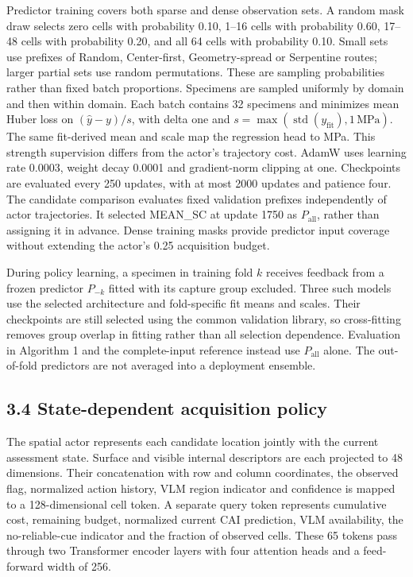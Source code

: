 Predictor training covers both sparse and dense observation sets. A random mask draw selects zero cells with probability 0.10, 1--16 cells with probability 0.60, 17--48 cells with probability 0.20, and all 64 cells with probability 0.10. Small sets use prefixes of Random, Center-first, Geometry-spread or Serpentine routes; larger partial sets use random permutations. These are sampling probabilities rather than fixed batch proportions. Specimens are sampled uniformly by domain and then within domain. Each batch contains 32 specimens and minimizes mean Huber loss on \((\hat{y}-y)/s\), with delta one and \(s=\max(\operatorname{std}(y_{\mathrm{fit}}),1\,\mathrm{MPa})\). The same fit-derived mean and scale map the regression head to MPa. This strength supervision differs from the actor's trajectory cost. AdamW uses learning rate 0.0003, weight decay 0.0001 and gradient-norm clipping at one. Checkpoints are evaluated every 250 updates, with at most 2000 updates and patience four. The candidate comparison evaluates fixed validation prefixes independently of actor trajectories. It selected MEAN\_SC at update 1750 as \(P_{\mathrm{all}}\), rather than assigning it in advance. Dense training masks provide predictor input coverage without extending the actor's 0.25 acquisition budget.

During policy learning, a specimen in training fold \(k\) receives feedback from a frozen predictor \(P_{-k}\) fitted with its capture group excluded. Three such models use the selected architecture and fold-specific fit means and scales. Their checkpoints are still selected using the common validation library, so cross-fitting removes group overlap in fitting rather than all selection dependence. Evaluation in Algorithm 1 and the complete-input reference instead use \(P_{\mathrm{all}}\) alone. The out-of-fold predictors are not averaged into a deployment ensemble.

\hypertarget{state-dependent-acquisition-policy}{%
\subsection{3.4 State-dependent acquisition policy}\label{state-dependent-acquisition-policy}}

The spatial actor represents each candidate location jointly with the current assessment state. Surface and visible internal descriptors are each projected to 48 dimensions. Their concatenation with row and column coordinates, the observed flag, normalized action history, VLM region indicator and confidence is mapped to a 128-dimensional cell token. A separate query token represents cumulative cost, remaining budget, normalized current CAI prediction, VLM availability, the no-reliable-cue indicator and the fraction of observed cells. These 65 tokens pass through two Transformer encoder layers \citep{vaswani2017} with four attention heads and a feed-forward width of 256.

